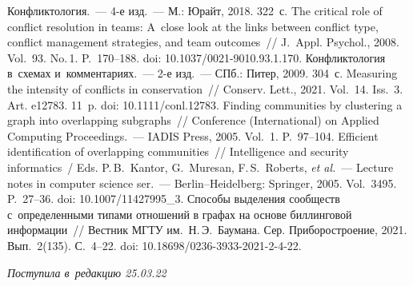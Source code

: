 \begin{multicols}{2}
{{\begin{thebibliography}{99}
 Конфликтология.~--- 4-е изд.~--- М.: Юрайт, 2018. 322~с.
 The critical role of conflict resolution in 
teams: A~close look at the links between conflict type, conflict management strategies, and team 
outcomes~// J.~Appl. Psychol., 2008. Vol.~93. No.\,1. P.~170--188. doi:  
10.1037/0021-9010.93.1.170.
 Конфликтология в~схемах и~комментариях.~--- 2-е изд.~--- СПб.: Питер, 2009. 304~с.
 Measuring the intensity 
of conflicts in conservation~// Conserv. Lett., 2021. Vol.~14. Iss.~3. Art. e12783. 11~p. doi: 
10.1111/conl.12783.
Finding communities by clustering a graph into overlapping subgraphs~// Conference (International)
 on Applied Computing Proceedings.~--- IADIS Press, 2005. Vol.~1. P.~97--104. 
 Efficient identification of overlapping 
communities~// Intelligence and security informatics~/ Eds. P.\,B.~Kantor, G.~Muresan, F.\,S.~Roberts, \textit{et al.}~--- 
Lecture notes in computer science ser.~--- Berlin--Heidelberg: Springer, 2005. 
Vol.~3495. P.~27--36. doi: 10.1007/11427995\_3. 
 Способы выделения сообществ 
с~определенными типами отношений в графах на основе биллинговой информации~// 
Вестник МГТУ им.\ Н.\,Э.~Баумана. Сер. Приборостроение, 2021. Вып.~2(135). С.~4--22. doi: 
10.18698/0236-3933-2021-2-4-22. 
\end{thebibliography}

 }
 }

\end{multicols}

\vspace*{-3pt}

\hfill{\small\textit{Поступила в~редакцию 25.03.22}}


\newpage


\vspace*{-28pt}





